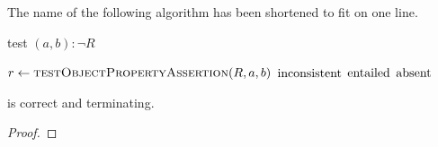 \documentclass[paper.tex]{subfiles}
\begin{document}
The name of the following algorithm has been shortened to fit on one line.

\begin{algorithm}[H]
  \caption{test $(a, b) : \neg R$}
  \begin{algorithmic}[1]
    \raggedright
      \State $r \gets \Call{testObjectPropertyAssertion}{R, a, b}$
        \State \Return $\mathrm{inconsistent}$
        \State \Return $\mathrm{entailed}$
      \Else
        \State \Return $\mathrm{absent}$
      \EndIf
    \EndFunction
  \end{algorithmic}
\end{algorithm}

\begin{theorem}
   is correct and terminating.
\end{theorem}
\begin{proof}
  \todo
\end{proof}
\end{document}
